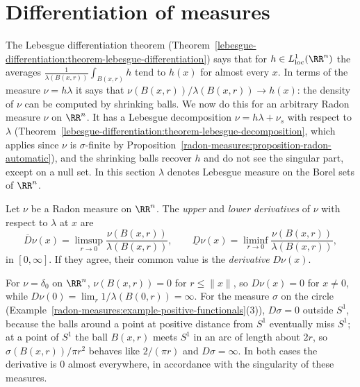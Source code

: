 \section{Differentiation of measures}\label{radon-measures:section-differentiation-measures}

The Lebesgue differentiation theorem (Theorem~\ref{lebesgue-differentiation:theorem-lebesgue-differentiation}) says that for $h \in L^1_{\mathrm{loc}}(\RR^n)$ the averages $\frac1{\lambda(B(x, r))}\int_{B(x, r)}h$
tend to $h(x)$ for almost every $x$. In terms of the measure $\nu = h\lambda$ it says that $\nu(B(x, r))/\lambda(B(x, r)) \to h(x)$: the density of $\nu$ can be computed by shrinking balls. We now do this
for an arbitrary Radon measure $\nu$ on $\RR^n$. It has a Lebesgue decomposition $\nu = h\lambda + \nu_s$ with respect to $\lambda$ (Theorem~\ref{lebesgue-differentiation:theorem-lebesgue-decomposition}, which
applies since $\nu$ is $\sigma$-finite by Proposition~\ref{radon-measures:proposition-radon-automatic}), and the shrinking balls recover $h$ and do not see the singular part, except on a null set. In this
section $\lambda$ denotes Lebesgue measure on the Borel sets of $\RR^n$.

\begin{definition}\label{radon-measures:definition-derivative-measure}
Let $\nu$ be a Radon measure on $\RR^n$. The \emph{upper} and \emph{lower derivatives} of $\nu$ with respect to $\lambda$ at $x$ are
\[
\overline{D}\nu(x) = \limsup_{r \to 0}\frac{\nu(B(x, r))}{\lambda(B(x, r))}, \qquad \underline{D}\nu(x) = \liminf_{r \to 0}\frac{\nu(B(x, r))}{\lambda(B(x, r))},
\]
in $[0, \infty]$. If they agree, their common value is the \emph{derivative} $D\nu(x)$.
\end{definition}

\begin{example}\label{radon-measures:example-derivative-measure}
For $\nu = \delta_0$ on $\RR^n$, $\nu(B(x, r)) = 0$ for $r \leq \|x\|$, so $D\nu(x) = 0$ for $x \neq 0$, while $D\nu(0) = \lim_r1/\lambda(B(0, r)) = \infty$. For the measure $\sigma$ on the circle
(Example~\ref{radon-measures:example-positive-functionals}(3)), $D\sigma = 0$ outside $S^1$, because the balls around a point at positive distance from $S^1$ eventually miss $S^1$; at a point of $S^1$ the ball
$B(x, r)$ meets $S^1$ in an arc of length about $2r$, so $\sigma(B(x, r))/\pi r^2$ behaves like $2/(\pi r)$ and $D\sigma = \infty$. In both cases the derivative is $0$ almost everywhere, in accordance
with the singularity of these measures.
\end{example}

